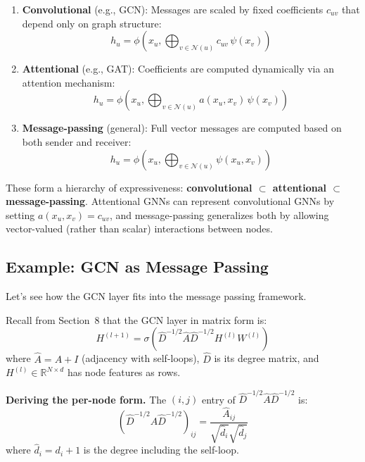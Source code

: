 \begin{notechapter}
\begin{enumerate}
    \item \textbf{Convolutional} (e.g., GCN): Messages are scaled by 
          fixed coefficients $c_{uv}$ that depend only on graph structure:
          \[
          h_u = \phi\left(x_u, \bigoplus_{v \in \mathcal{N}(u)} c_{uv} \, \psi(x_v)\right)
          \]
          
    \item \textbf{Attentional} (e.g., GAT): Coefficients are computed 
          dynamically via an attention mechanism:
          \[
          h_u = \phi\left(x_u, \bigoplus_{v \in \mathcal{N}(u)} 
              a(x_u, x_v) \, \psi(x_v)\right)
          \]
          
    \item \textbf{Message-passing} (general): Full vector messages are 
          computed based on both sender and receiver:
          \[
          h_u = \phi\left(x_u, \bigoplus_{v \in \mathcal{N}(u)} 
              \psi(x_u, x_v)\right)
          \]
\end{enumerate}

These form a hierarchy of expressiveness: 
\textbf{convolutional $\subset$ attentional $\subset$ message-passing}. 
Attentional GNNs can represent convolutional GNNs by setting 
$a(x_u, x_v) = c_{uv}$, and message-passing generalizes both by allowing 
vector-valued (rather than scalar) interactions between nodes.

\subsection{Example: GCN as Message Passing}

Let's see how the GCN layer fits into the message passing framework.

\begin{example}
Recall from Section~8 that the GCN layer in matrix form is:
\[
H^{(l+1)} = \sigma\left( \hat{D}^{-1/2} \hat{A} \hat{D}^{-1/2} 
             H^{(l)} W^{(l)} \right)
\]
where $\hat{A} = A + I$ (adjacency with self-loops), $\hat{D}$ is 
its degree matrix, and $H^{(l)} \in \mathbb{R}^{N \times d}$ has node 
features as rows.

\textbf{Deriving the per-node form.} The $(i,j)$ entry of 
$\hat{D}^{-1/2} \hat{A} \hat{D}^{-1/2}$ is:
\[
\left(\hat{D}^{-1/2} \hat{A} \hat{D}^{-1/2}\right)_{ij} = 
\frac{\hat{A}_{ij}}{\sqrt{\hat{d}_i}\sqrt{\hat{d}_j}}
\]
where $\hat{d}_i = d_i + 1$ is the degree including the self-loop.


\end{example}
\end{notechapter}

